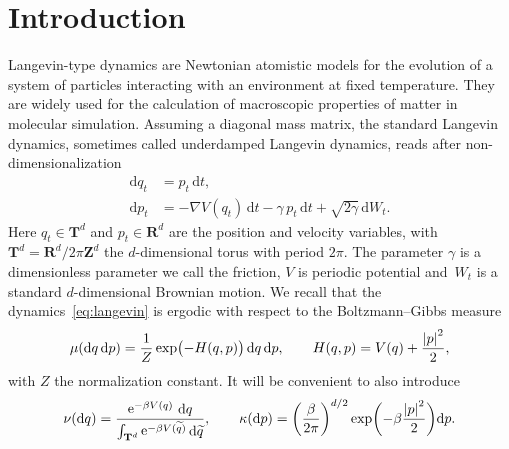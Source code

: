 \documentclass[11pt,a4paper]{article}
\DeclareMathOperator{\e}{e}
\newcommand{\real}{\mathbf R}
\newcommand{\integer}{\mathbf Z}
\newcommand{\torus}{\mathbf T}
\newcommand{\grad}{\nabla}
\renewcommand{\d}{\mathrm d}
\theoremstyle{plain}
\numberwithin{equation}{section}
\begin{document}
\section{Introduction}%
Langevin-type dynamics are Newtonian atomistic models for the evolution of a system of particles interacting with an environment at fixed temperature.
They are widely used for the calculation of macroscopic properties of matter in molecular simulation.
Assuming a diagonal mass matrix,
the standard Langevin dynamics, sometimes called underdamped Langevin dynamics,
reads after non-dimensionalization~\cite[Section 2.2.4]{MR2681239}
\begin{subequations}
\label{eq:langevin}
\begin{align}
    \label{eq:langevin_q}
    \d q_t &= p_t \, \d t, \\
    \label{eq:langevin_p}
    \d p_t &= - \grad V(q_t) \, \d t - \gamma \, p_t \, \d t + \sqrt{2 \gamma} \, \d W_t.
\end{align}
\end{subequations}
Here $q_t \in \torus^d$ and $p_t \in \real^d$ are the position and velocity variables,
with~$\torus^d = \real^d / 2\pi \integer^d$ the $d$-dimensional torus with period $2 \pi$.
The parameter $\gamma$ is a dimensionless parameter we call the friction,
$V$ is periodic potential
and~$W_t$ is a standard $d$-dimensional Brownian motion.
We recall that the dynamics~\eqref{eq:langevin} is ergodic with respect to the Boltzmann--Gibbs measure
\begin{equation}
    \label{eq:invariant_measure}
    \mu(\d q \, \d p) = \frac{1}{Z} \exp \bigl( - H(q, p)  \bigr) \, \d q \, \d p,
    \qquad H(q, p) = V(q) + \frac{\abs{p}^2}{2},
\end{equation}
with $Z$ the normalization constant.
It will be convenient to also introduce
\begin{equation}
    \label{eq:definition_prob_measures}
    \nu(\d q) = \frac{\e^{- \beta V(q)} \, \d q}{\int_{\torus^d}\e^{-\beta V(\widetilde q)} \d \widetilde q},
    \qquad \kappa(\d p) = \left( \frac{\beta}{2 \pi} \right)^{d/2}\exp \biggl( - \beta \frac{\abs*{p}^2}{2} \biggr) \d p.
\end{equation}
\end{document}
